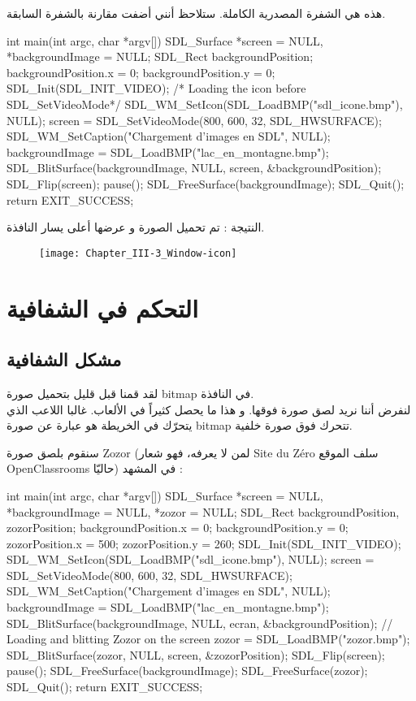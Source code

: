 هذه هي الشفرة المصدرية الكاملة. ستلاحظ أنني أضفت
مقارنة بالشفرة السابقة.

\begin{Csource}
int main(int argc, char *argv[])
{
	SDL_Surface *screen = NULL, *backgroundImage = NULL;
	SDL_Rect backgroundPosition;
	backgroundPosition.x = 0;
	backgroundPosition.y = 0;
	SDL_Init(SDL_INIT_VIDEO);
	/* Loading the icon before SDL_SetVideoMode*/
	SDL_WM_SetIcon(SDL_LoadBMP("sdl_icone.bmp"), NULL);
	screen = SDL_SetVideoMode(800, 600, 32, SDL_HWSURFACE);
	SDL_WM_SetCaption("Chargement d'images en SDL", NULL);
	backgroundImage = SDL_LoadBMP("lac_en_montagne.bmp");
	SDL_BlitSurface(backgroundImage, NULL, screen, &backgroundPosition);
	SDL_Flip(screen);
	pause();
	SDL_FreeSurface(backgroundImage);
	SDL_Quit();
	return EXIT_SUCCESS;
}
\end{Csource}

النتيجة : تم تحميل الصورة و عرضها أعلى يسار النافذة.

\begin{figure}[H]
	\centering
	\texttt{[image: Chapter\_III-3\_Window-icon]}
\end{figure}

\section{التحكم في الشفافية}

\subsection{مشكل الشفافية}

لقد قمنا قبل قليل بتحميل صورة 
\textenglish{bitmap}
في النافذة.\\
لنفرض أننا نريد لصق صورة فوقها. و هذا ما يحصل كثيراً في الألعاب. غالبا اللاعب الذي يتحرّك في الخريطة هو عبارة عن صورة 
\textenglish{bitmap}
تتحرك فوق صورة خلفية.

سنقوم بلصق صورة
\textenglish{Zozor}
(لمن لا يعرفه، فهو شعار
\textenglish{Site du Zéro}
سلف الموقع 
\textenglish{OpenClassrooms}
حاليّا) في المشهد :

\begin{Csource}
int main(int argc, char *argv[])
{
	SDL_Surface *screen = NULL, *backgroundImage = NULL, *zozor = NULL;
	SDL_Rect backgroundPosition, zozorPosition;
	backgroundPosition.x = 0;
	backgroundPosition.y = 0;
	zozorPosition.x = 500;
	zozorPosition.y = 260;
	SDL_Init(SDL_INIT_VIDEO);
	SDL_WM_SetIcon(SDL_LoadBMP("sdl_icone.bmp"), NULL);
	screen = SDL_SetVideoMode(800, 600, 32, SDL_HWSURFACE);
	SDL_WM_SetCaption("Chargement d'images en SDL", NULL);
	backgroundImage = SDL_LoadBMP("lac_en_montagne.bmp");
	SDL_BlitSurface(backgroundImage, NULL, ecran, &backgroundPosition);
	// Loading and blitting Zozor on the screen
	zozor = SDL_LoadBMP("zozor.bmp");
	SDL_BlitSurface(zozor, NULL, screen, &zozorPosition);
	SDL_Flip(screen);
	pause();
	SDL_FreeSurface(backgroundImage);
	SDL_FreeSurface(zozor);
	SDL_Quit();
	return EXIT_SUCCESS;
}
\end{Csource}

